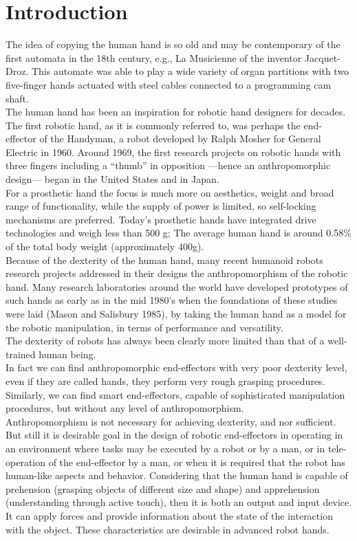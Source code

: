 \documentclass[a4paper, 10pt, conference]{ieeeconf}      %
\begin{document}
\section{\textbf{Introduction}}
The idea of copying the human hand is so old and may be contemporary of the first automata in the 18th century, e.g., La Musicienne of the inventor Jacquet-Droz. This automate was able to play a wide variety of organ partitions with two five-finger hands actuated with steel cables connected to a programming cam shaft.\\
The human hand has been an inspiration for robotic hand designers for decades. The first robotic hand, as it is commonly referred to, was perhaps the end-effector of the Handyman, a robot developed by Ralph Mosher for General Electric in 1960. Around 1969, the first research projects on robotic hands with three fingers including a “thumb” in opposition —hence an anthropomorphic design— began in the United States and in Japan.\\
For a prosthetic hand the focus is much more on aesthetics, weight and broad range of functionality, while the supply of power is limited, so self-locking mechanisms are preferred. Today's prosthetic hands have integrated drive technologies and weigh less than 500 g; The average human hand is around 0.58\% of the total body weight (approximately 400g).\\
Because of the dexterity of the human hand, many recent humanoid robots research projects addressed in their designs the anthropomorphism of the robotic hand. Many research laboratories around the world have developed prototypes of such hands as early as in the mid 1980’s when the foundations of these studies were laid (Mason and Salisbury 1985), by taking the human hand as a model for the robotic manipulation, in terms of performance and versatility.\\
The dexterity of robots has always been clearly more limited than that of a well-trained human being.\\
In fact we can find anthropomorphic end-effectors with very poor dexterity level, even if they are called hands, they perform very rough grasping procedures. Similarly, we can find smart end-effectors, capable of sophisticated manipulation procedures, but without any level of anthropomorphism.\\
Anthropomorphism is not necessary for achieving dexterity, and nor sufficient. But still it is desirable goal in the design of robotic end-effectors in operating in an environment where tasks may be executed by a robot or by a man, or in tele-operation of the end-effector by a man, or when it is required that the robot has human-like aspects and behavior. Considering that the human hand is capable of prehension (grasping objects of different size and shape) and apprehension (understanding through active touch), then it is both an output and input device. It can apply forces and provide information about the state of the interaction with the object. These characteristics are desirable in advanced robot hands.\\
\end{document}
